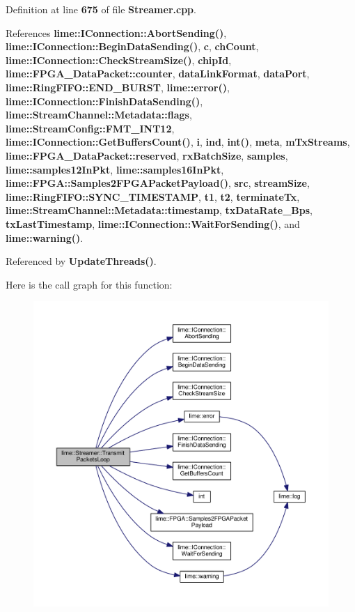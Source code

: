 Definition at line {\bf 675} of file {\bf Streamer.\+cpp}.



References {\bf lime\+::\+I\+Connection\+::\+Abort\+Sending()}, {\bf lime\+::\+I\+Connection\+::\+Begin\+Data\+Sending()}, {\bf c}, {\bf ch\+Count}, {\bf lime\+::\+I\+Connection\+::\+Check\+Stream\+Size()}, {\bf chip\+Id}, {\bf lime\+::\+F\+P\+G\+A\+\_\+\+Data\+Packet\+::counter}, {\bf data\+Link\+Format}, {\bf data\+Port}, {\bf lime\+::\+Ring\+F\+I\+F\+O\+::\+E\+N\+D\+\_\+\+B\+U\+R\+ST}, {\bf lime\+::error()}, {\bf lime\+::\+I\+Connection\+::\+Finish\+Data\+Sending()}, {\bf lime\+::\+Stream\+Channel\+::\+Metadata\+::flags}, {\bf lime\+::\+Stream\+Config\+::\+F\+M\+T\+\_\+\+I\+N\+T12}, {\bf lime\+::\+I\+Connection\+::\+Get\+Buffers\+Count()}, {\bf i}, {\bf ind}, {\bf int()}, {\bf meta}, {\bf m\+Tx\+Streams}, {\bf lime\+::\+F\+P\+G\+A\+\_\+\+Data\+Packet\+::reserved}, {\bf rx\+Batch\+Size}, {\bf samples}, {\bf lime\+::samples12\+In\+Pkt}, {\bf lime\+::samples16\+In\+Pkt}, {\bf lime\+::\+F\+P\+G\+A\+::\+Samples2\+F\+P\+G\+A\+Packet\+Payload()}, {\bf src}, {\bf stream\+Size}, {\bf lime\+::\+Ring\+F\+I\+F\+O\+::\+S\+Y\+N\+C\+\_\+\+T\+I\+M\+E\+S\+T\+A\+MP}, {\bf t1}, {\bf t2}, {\bf terminate\+Tx}, {\bf lime\+::\+Stream\+Channel\+::\+Metadata\+::timestamp}, {\bf tx\+Data\+Rate\+\_\+\+Bps}, {\bf tx\+Last\+Timestamp}, {\bf lime\+::\+I\+Connection\+::\+Wait\+For\+Sending()}, and {\bf lime\+::warning()}.



Referenced by {\bf Update\+Threads()}.



Here is the call graph for this function\+:
\nopagebreak
\begin{figure}[H]
\begin{center}
\leavevmode
\includegraphics[width=350pt]{d9/d5d/classlime_1_1Streamer_a7609688279492ce5938fcee2e9a5cfb2_cgraph}
\end{center}
\end{figure}




